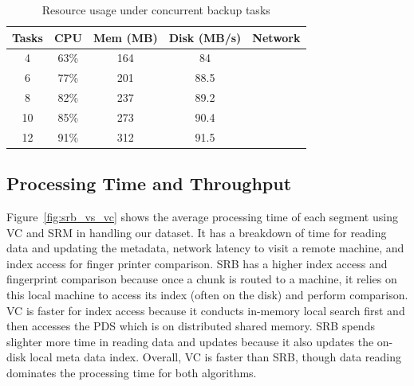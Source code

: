 \begin{table}
    \begin{tabular}{|c|c|c|c|c|}
    \hline
    Tasks & CPU & Mem (MB) & Disk (MB/s) & Network \\ \hline
    4                      & 63\% & 164 & 84     &    \\ \hline
    6                      & 77\% & 201  & 88.5   &     \\ \hline
    8                      & 82\% & 237   & 89.2   &    \\ \hline
    10                      & 85\% & 273   & 90.4   &    \\ \hline
    12                      & 91\% & 312    & 91.5   &   \\ \hline
    \end{tabular}
\caption{Resource usage under concurrent backup tasks}
\label{tab:resource_usage}
\end{table}


\subsection{Processing Time and Throughput}

Figure~\ref{fig:srb_vs_vc} shows
the  average  processing  time of  each segment using VC and SRM in handling our dataset.
It has a breakdown of time for reading data and updating the metadata, network latency to visit
a remote machine, and index access for finger printer comparison.
SRB has a higher index access and fingerprint comparison because once a chunk is routed to a machine,
it relies on this local machine to access its index (often on the disk) and perform comparison.
VC is faster for index access because it conducts in-memory local search first and then
accesses  the PDS which is on distributed shared memory.  
SRB spends  slighter more time in  reading data and updates because it also updates the on-disk
local meta data index.
Overall,  VC is faster than SRB, though data reading dominates the processing time for both algorithms.

